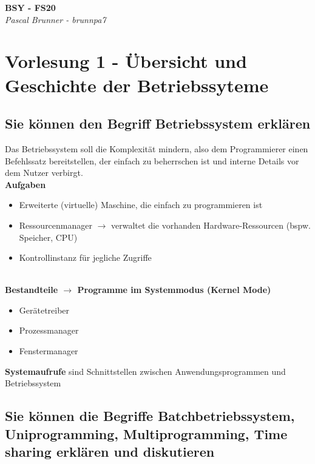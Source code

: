 \documentclass{report}
\theoremstyle{definition}
\theoremstyle{example}
\begin{document}
\begin{titlepage}
   \begin{center}
      \Large\textbf{BSY - FS20}\\
      \large\textit{Pascal Brunner - brunnpa7}
   \end{center}
\end{titlepage}


\tableofcontents
\newpage

\chapter{Vorlesung 1 - Übersicht und Geschichte der Betriebssyteme}

\section{Sie können den Begriff Betriebssystem erklären}
Das Betriebssystem soll die Komplexität mindern, also dem Programmierer einen Befehlssatz bereitstellen, der einfach zu beherrschen ist und interne Details vor dem Nutzer verbirgt.\\

\textbf{Aufgaben}\\
	\begin{itemize}
		\item Erweiterte (virtuelle) Maschine, die einfach zu programmieren ist
		\item Ressourcenmanager $\rightarrow$ verwaltet die vorhanden Hardware-Ressourcen (bspw. Speicher, CPU)
		\item Kontrollinstanz für jegliche Zugriffe
	\end{itemize}
	\\

\textbf{Bestandteile $\rightarrow$ Programme im Systemmodus (Kernel Mode)}
	\begin{itemize}
		\item Gerätetreiber
		\item Prozessmanager
		\item Fenstermanager
	\end{itemize}
	
\textbf{Systemaufrufe} sind Schnittstellen zwischen Anwendungsprogrammen und Betriebssystem

\section{Sie können die Begriffe Batchbetriebssystem, Uniprogramming, Multiprogramming, Time sharing erklären und diskutieren}
\end{document}
